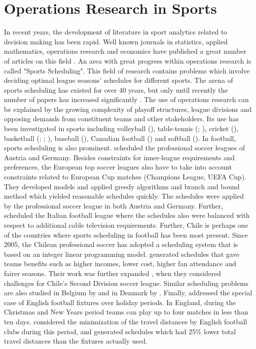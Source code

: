 \section{Operations Research in Sports} \label{Opt_Models_for_Fantasy_Sports}

In recent years, the development of literature in sport analytics related to decision making has been rapid. Well known journals in statistics, applied mathematics, operations research and economics have published a great number of articles on this field \citep{Coleman}. An area with great progress within operations research is called "Sports Scheduling". This field of research contains problems which involve deciding optimal league seasons' schedules for different sports. The arena of sports scheduling has existed for over 40 years, but only until recently the number of papers has increased significantly \citep{Kendall}. The use of operations research can be explained by the growing complexity of playoff structures, league divisions and opposing demands from constituent teams and other stakeholders. Its use has been investigated in sports including volleyball (\cite{arg_volleyball}), table-tennis (\cite{Mattfeld}; \cite{Knust}), cricket (\cite{Mwright}), basketball (\cite{Wright}; \cite{van_Voorhis}; \cite{Henz}), baseball (\cite{Trick}), Canadian football (\cite{Kostuk}) and softball (\cite{Saur}). In football, sports scheduling is also prominent. \cite{Bartsch} scheduled the professional soccer leagues of Austria and Germany. Besides constraints for inner-league requirements and preferences, the European top soccer leagues also have to take into account constraints related to European Cup matches (Champions League, UEFA Cup). They developed models and applied greedy algorithms and branch and bound method which yielded reasonable schedules quickly. The schedules were applied by the professional soccer league in both Austria and Germany. Further, \cite{Della} scheduled the Italian football league where the schedules also were balanced with respect to additional cable television requirements. Further, Chile is perhaps one of the countries where sports scheduling in football has been most present. Since 2005, the Chilean professional soccer has adopted a scheduling system that is based on an integer linear programming model. \cite{Guajardo} generated schedules that gave teams benefits such as higher incomes, lower cost, higher fan attendance and fairer seasons. Their work was further expanded \citep{Duran}, when they considered challenges for Chile's Second Division soccer league. Similar scheduling problems are also studied in Belgium by \cite{Goossens} and in Denmark by \cite{Rasmussen}. Finally, \cite{Kendall} addressed the special case of English football fixtures over holiday periods. In England, during the Christmas and New Years period teams can play up to four matches in less than ten days. \cite{Kendall} considered the minimization of the travel distances by English football clubs during this period, and generated schedules which had 25\% lower total travel distances than the fixtures actually used. 

